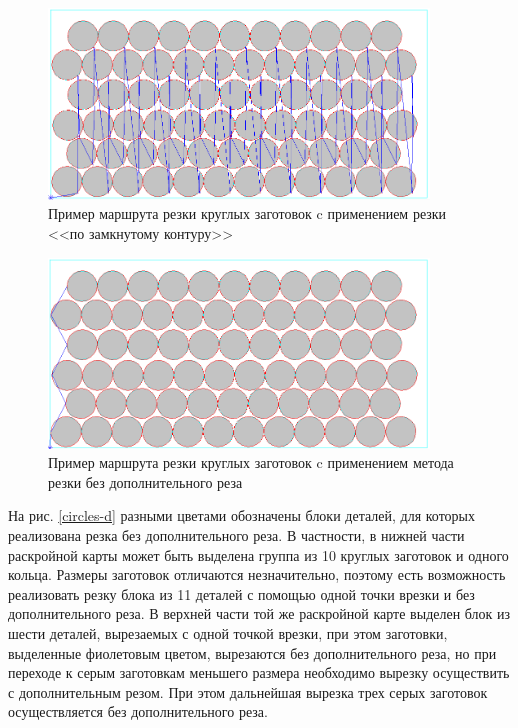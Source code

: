 \documentclass[11pt,twoside]{report}
\begin{document}
\begin{figure}
  \begin{center}
  \includegraphics[width=0.9\textwidth]{circles-a.png}
  \caption{Пример маршрута резки круглых заготовок c применением резки <<по замкнутому контуру>>}
  \label{circles-a}
  \end{center}
\end{figure}

\begin{figure}
  \begin{center}
  \includegraphics[width=0.9\textwidth]{circles-b.png}
  \caption{Пример маршрута резки круглых заготовок c применением метода резки без дополнительного реза}
  \label{circles-b}
  \end{center}
\end{figure}

На рис. \ref{circles-d}
разными цветами обозначены блоки деталей,
для которых реализована резка без дополнительного реза.
В частности, в нижней  части раскройной карты
может быть выделена
группа из 10 круглых заготовок и одного кольца.
Размеры заготовок отличаются незначительно,
поэтому есть возможность реализовать резку блока из 11 деталей с
помощью одной точки врезки и без дополнительного реза.
В  верхней части той же раскройной карте выделен блок из шести деталей,
вырезаемых с одной точкой врезки, при этом заготовки,
выделенные фиолетовым цветом, вырезаются без дополнительного реза,
но при переходе к серым заготовкам меньшего размера необходимо
вырезку осуществить с дополнительным резом.
При этом дальнейшая вырезка трех серых заготовок
осуществляется без дополнительного реза.
\end{document}
